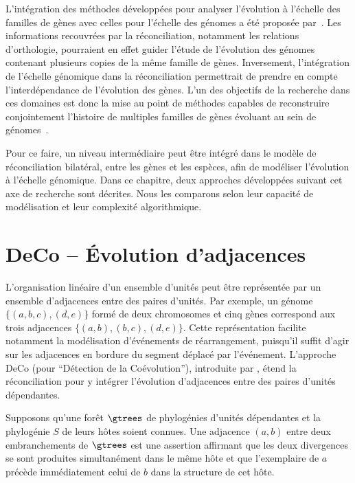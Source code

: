 L’intégration des méthodes développées pour analyser l’évolution à l’échelle des familles de gènes avec celles pour l’échelle des génomes a été proposée par~\textcite{Sankoff2000DuplicationRearrangementReconciliation}.
Les informations recouvrées par la réconciliation, notamment les relations d’orthologie, pourraient en effet guider l’étude de l’évolution des génomes contenant plusieurs copies de la même famille de gènes.
Inversement, l’intégration de l’échelle génomique dans la réconciliation permettrait de prendre en compte l’interdépendance de l’évolution des gènes.
L’un des objectifs de la recherche dans ces domaines est donc la mise au point de méthodes capables de reconstruire conjointement l’histoire de multiples familles de gènes évoluant au sein de génomes~\parencite[voir aussi][]{Chauve2013DuplicationRearrangementReconciliation}.

Pour ce faire, un niveau intermédiaire peut être intégré dans le modèle de réconciliation bilatéral, entre les gènes et les espèces, afin de modéliser l’évolution à l’échelle génomique.
Dans ce chapitre, deux approches développées suivant cet axe de recherche sont décrites.
Nous les comparons selon leur capacité de modélisation et leur complexité algorithmique.

\section{DeCo -- Évolution d’adjacences}

L’organisation linéaire d’un ensemble d’unités peut être représentée par un ensemble d’adjacences entre des paires d’unités.
Par exemple, un génome \(\{(a, b, c), (d, e)\}\) formé de deux chromosomes et cinq gènes correspond aux trois adjacences \(\{(a, b), (b, c), (d, e)\}\).
Cette représentation facilite notamment la modélisation d’événements de réarrangement, puisqu’il suffit d’agir sur les adjacences en bordure du segment déplacé par l’événement.
L’approche DeCo (pour \enquote{Détection de la Coévolution}), introduite par \textcite{Berard2012EvolutionGeneNeighborhoods}, étend la réconciliation pour y intégrer l’évolution d’adjacences entre des paires d’unités dépendantes.

Supposons qu’une forêt \(\gtrees\) de phylogénies d’unités dépendantes et la phylogénie \(S\) de leurs hôtes soient connues.
Une adjacence \((a, b)\) entre deux embranchements de \(\gtrees\) est une assertion affirmant que les deux divergences se sont produites simultanément dans le même hôte et que l’exemplaire de \(a\) précède immédiatement celui de \(b\) dans la structure de cet hôte.

